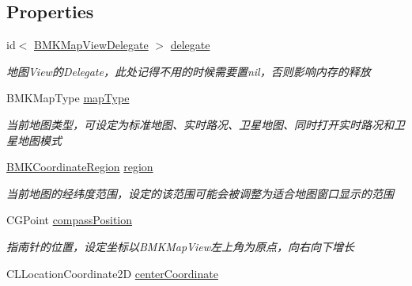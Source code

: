 \subsection*{Properties}
\begin{DoxyCompactItemize}
\item 
\hypertarget{interface_b_m_k_map_view_a80806d05b9f82dcf5630110b5d20dc2c}{id$<$ \hyperlink{protocol_b_m_k_map_view_delegate-p}{B\-M\-K\-Map\-View\-Delegate} $>$ \hyperlink{interface_b_m_k_map_view_a80806d05b9f82dcf5630110b5d20dc2c}{delegate}}\label{interface_b_m_k_map_view_a80806d05b9f82dcf5630110b5d20dc2c}

\begin{DoxyCompactList}\small\item\em 地图\-View的\-Delegate，此处记得不用的时候需要置nil，否则影响内存的释放 \end{DoxyCompactList}\item 
\hypertarget{interface_b_m_k_map_view_add5778e2d3c080b0ae2ce63538082fea}{B\-M\-K\-Map\-Type \hyperlink{interface_b_m_k_map_view_add5778e2d3c080b0ae2ce63538082fea}{map\-Type}}\label{interface_b_m_k_map_view_add5778e2d3c080b0ae2ce63538082fea}

\begin{DoxyCompactList}\small\item\em 当前地图类型，可设定为标准地图、实时路况、卫星地图、同时打开实时路况和卫星地图模式 \end{DoxyCompactList}\item 
\hypertarget{interface_b_m_k_map_view_ae54e847bb82b4e087ced8dc399a2d020}{\hyperlink{struct_b_m_k_coordinate_region}{B\-M\-K\-Coordinate\-Region} \hyperlink{interface_b_m_k_map_view_ae54e847bb82b4e087ced8dc399a2d020}{region}}\label{interface_b_m_k_map_view_ae54e847bb82b4e087ced8dc399a2d020}

\begin{DoxyCompactList}\small\item\em 当前地图的经纬度范围，设定的该范围可能会被调整为适合地图窗口显示的范围 \end{DoxyCompactList}\item 
\hypertarget{interface_b_m_k_map_view_adad44db2dcfaa2d92e5eabef40f32bd8}{C\-G\-Point \hyperlink{interface_b_m_k_map_view_adad44db2dcfaa2d92e5eabef40f32bd8}{compass\-Position}}\label{interface_b_m_k_map_view_adad44db2dcfaa2d92e5eabef40f32bd8}

\begin{DoxyCompactList}\small\item\em 指南针的位置，设定坐标以\-B\-M\-K\-Map\-View左上角为原点，向右向下增长 \end{DoxyCompactList}\item 
\hypertarget{interface_b_m_k_map_view_aa19c4d034a7861589044326107985632}{C\-L\-Location\-Coordinate2\-D \hyperlink{interface_b_m_k_map_view_aa19c4d034a7861589044326107985632}{center\-Coordinate}}\label{interface_b_m_k_map_view_aa19c4d034a7861589044326107985632}


\end{DoxyCompactItemize}
